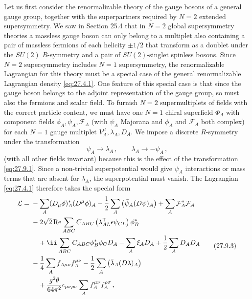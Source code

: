 Let us first consider the renormalizable theory of the gauge bosons of a
general gauge group, together with the superpartners required by \(N=2\)
extended supersymmetry. We saw in Section 25.4 that in \(N=2\) global
supersymmetry theories a massless gauge boson can only belong to a multiplet
also containing a pair of massless fermions of each helicity
\(\mathord{\pm}1/2\) that transform as a doublet under the \(SU(2)\)
\(R\)-symmetry and a pair of \(SU(2)\)-singlet spinless bosons. Since \(N=2\)
supersymmetry includes \(N=1\) supersymmetry, the renormalizable Lagrangian
for this theory must be a special case of the general renormalizable
Lagrangian density \eqref{eq:27.4.1}. One feature of this special case is that
since the gauge boson belongs to the adjoint representation of the gauge
group, so must also the fermions and scalar field. To furnish \(N=2\)
supermultiplets of fields with the correct particle content, we must have one
\(N=1\) chiral superfield \(\Phi_A\) with component fields
\(\phi_A,\psi_A,\mathcal{F}_A\) (with \(\psi_A\) Majorana and \(\phi_A\) and
\(\mathcal{F}_A\) both complex) for each \(N=1\) gauge multiplet
\(V_A^\mu,\lambda_A,D_A\). We impose a discrete \(R\)-symmetry under the
transformation
\begin{equation}
  \psi_A\longrightarrow\lambda_A\,,
  \qquad
  \lambda_A\longrightarrow-\psi_A\,,
  \tag{27.9.2}\label{eq:27.9.2}
\end{equation}
(with all other fields invariant) because this is the effect of the
transformation \eqref{eq:27.9.1}. Since a non-trivial superpotential would
give \(\psi_A\) interactions or mass terms that are absent for \(\lambda_A\),
the superpotential must vanish. The Lagrangian \eqref{eq:27.4.1} therefore
takes the special form
\begin{equation}
  \begin{aligned}
  \mathcal{L}={}&
  -\sum_A(D_\mu\phi)_A^*(D^\mu\phi)_A
  -\frac12\sum_A\left(\bar\psi_A(\sl{D}\psi)_A\right)
  +\sum_A\mathcal{F}_A^*\mathcal{F}_A
  \\
  &-2\sqrt{2}\operatorname{Re}\sum_{ABC}
    C_{ABC}\left(\lambda_{AL}^{\mathsf T}\epsilon\psi_{CL}\right)\phi_B^*
  \\
  &\quad
  +\ii\sum_{ABC}C_{ABC}\phi_B^*\phi_CD_A
  -\sum_A\xi_AD_A+\frac12\sum_AD_AD_A
  \\
  &-\frac14\sum_Af_{A\mu\nu}f_A^{\mu\nu}
  -\frac12\sum_A\left(\bar\lambda_A(\sl{D}\lambda)_A\right)
  \\
  &\quad
  +\frac{g^2\theta}{64\pi^2}\epsilon_{\mu\nu\rho\sigma}
    \sum_Af_A^{\mu\nu}f_A^{\rho\sigma}\,,
  \end{aligned}
  \tag{27.9.3}\label{eq:27.9.3}
\end{equation}
